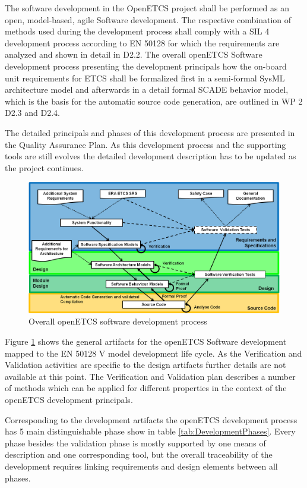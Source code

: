 \documentclass{template/openetcs_report}
\begin{document}
The software development in the OpenETCS project shall be performed as an open, model-based, agile Software development. The respective combination of methods used during the development process shall comply with a SIL 4 development process according to EN 50128 for which the requirements are analyzed and shown in detail in D2.2. The overall openETCS Software development process presenting the development principals how the on-board unit requirements for ETCS shall be formalized first in a semi-formal SysML architecture model and afterwards in a detail formal SCADE behavior model, which is the basis for the automatic source code generation, are outlined in WP 2 D2.3 and D2.4. 

The detailed principals and phases of this development process are presented in the Quality Assurance Plan. As this development process and the supporting tools are still evolves the detailed development description has to be updated as the project continues.

\begin{figure}[htbp]
\centering
\includegraphics[width=0.9\linewidth]{./images/openETCS-Software-Development}
\caption{Overall openETCS software development process}
\label{fig:DevopmentProcess}
\end{figure}

Figure \ref{fig:DevopmentProcess} shows the general artifacts for the openETCS Software development mapped to the EN 50128 V model development life cycle. As the Verification and Validation activities are specific to the design artifacts further details are not available at this point. The Verification and Validation plan describes a number of methods which can be applied for different properties in the context of the openETCS development principals.

Corresponding to the development artifacts the openETCS development process has 5 main distinguishable phase show in table \ref{tab:DevelopmentPhases}. Every phase besides the validation phase is mostly supported by one means of description and one corresponding tool, but the overall traceability of the development requires linking requirements and design elements between all phases. 
\end{document}
